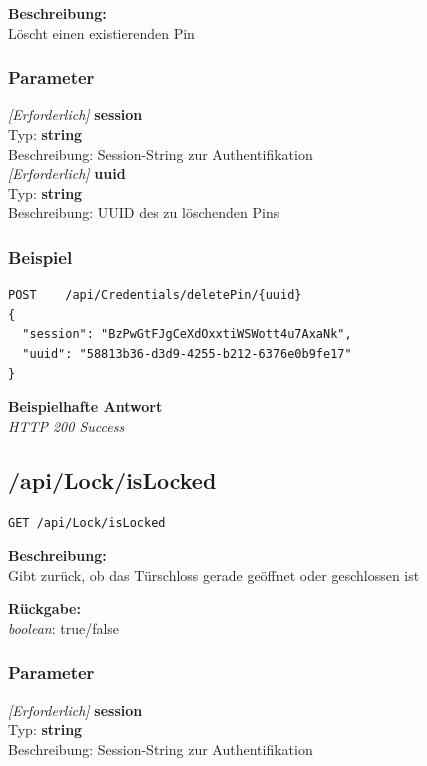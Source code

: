 \textbf{Beschreibung:} \\
Löscht einen existierenden Pin

\subsubsection{Parameter}
\textit{[Erforderlich]} \textbf{session} \\
Typ: \textbf{string} \\
Beschreibung: Session-String zur Authentifikation \\

\textit{[Erforderlich]} \textbf{uuid} \\
Typ: \textbf{string} \\
Beschreibung: UUID des zu löschenden Pins

\subsubsection{Beispiel}
\begin{lstlisting}
POST    /api/Credentials/deletePin/{uuid}
{
  "session": "BzPwGtFJgCeXdOxxtiWSWott4u7AxaNk",
  "uuid": "58813b36-d3d9-4255-b212-6376e0b9fe17"
}
\end{lstlisting}
\textbf{Beispielhafte Antwort} \\
\textit{HTTP 200 Success}





\subsection{/api/Lock/isLocked}
\begin{lstlisting}
GET /api/Lock/isLocked
\end{lstlisting}

\textbf{Beschreibung:} \\
Gibt zurück, ob das Türschloss gerade geöffnet oder geschlossen ist

\textbf{Rückgabe:} \\
\textit{boolean}: true/false

\subsubsection{Parameter}
\textit{[Erforderlich]} \textbf{session} \\
Typ: \textbf{string} \\
Beschreibung: Session-String zur Authentifikation

